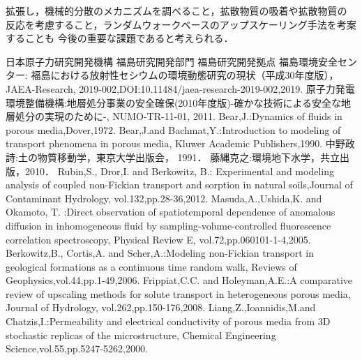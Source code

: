 \documentclass{jsce}
\begin{document}
拡張し，機械的分散のメカニズムを調べること，拡散物質の吸着や拡散物質の
反応を考慮すること，ランダムウォークベースのアップスケーリング手法を考案することも
今後の重要な課題であると考えられる．
\vspace{0mm}
\begin{thebibliography}{99}
\begin{spacing}{1.175}
	日本原子力研究開発機構 福島研究開発部門 福島研究開発拠点 福島環境安全センター:  
	福島における放射性セシウムの環境動態研究の現状（平成30年度版），JAEA-Research,
	2019-002,DOI:10.11484/jaea-research-2019-002,2019.
	原子力発電環境整備機構:地層処分事業の安全確保(2010年度版)-確かな技術による安全な地層処分の実現のために-, NUMO-TR-11-01, 2011.
	Bear,J.:Dynamics of fluids in porous media,Dover,1972.
	Bear,J.and Bachmat,Y.:Introduction to modeling of transport phenomena in porous media, Kluwer Academic Publishers,1990.
	中野政詩:土の物質移動学，東京大学出版会， 1991．
	藤縄克之:環境地下水学，共立出版，2010．
	Rubin,S., Dror,I. and Berkowitz, B.: Experimental and 
		modeling analysis of coupled non-Fickian transport and 
		sorption in natural soils,Journal of Contaminant Hydrology, vol.132,pp.28-36,2012.
\newpage
{}
	Masuda,A.,Ushida,K. and Okamoto, T. :Direct observation of spatiotemporal dependence of anomalous diffusion in 
		inhomogeneous 
		fluid by sampling-volume-controlled fluorescence correlation spectroscopy, Physical Review E, vol.72,pp.060101-1-4,2005.
	Berkowitz,B., Cortis,A. and Scher,A.:Modeling non-Fickian transport in geological formations as a continuous time random walk, Reviews of Geophysics,vol.44,pp.1-49,2006.
	Frippiat,C.C. and Holeyman,A.E.:A comparative review of upscaling methods for solute transport in heterogeneous porous media, Journal of Hydrology, vol.262,pp.150-176,2008.
	Liang,Z.,Ioannidis,M.and Chatzis,I.:Permeability and electrical conductivity of porous media from 3D stochastic replicas of the microstructure, Chemical Engineering Science,vol.55,pp.5247-5262,2000. 

\end{spacing}
\end{thebibliography}
\end{document}
